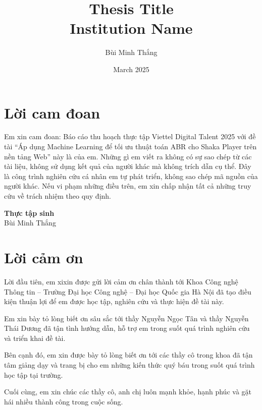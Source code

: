 \documentclass[12pt]{report}
\title{
    {Thesis Title}\\
    {\large Institution Name}\\
}
\author{Bùi Minh Thắng}
\date{March 2025}
\begin{document}




\chapter*{Lời cam đoan}
Em xin cam đoan: Báo cáo thu hoạch thực tập Viettel Digital Talent 2025 với đề tài “Áp dụng Machine Learning để tối ưu thuật toán ABR cho Shaka Player trên nền tảng Web” này là của em. Những gì em viết ra không có sự sao chép từ các tài liệu, không sử dụng kết quả của người khác mà không trích dẫn cụ thể. Đây là công trình nghiên cứu cá nhân em tự phát triển, không sao chép mã nguồn của người khác. Nếu vi phạm những điều trên, em xin chấp nhận tất cả những truy cứu về trách nhiệm theo quy định.

\vspace{2cm} %
\noindent
\hfill
\begin{minipage}{0.4\textwidth}
    \centering
    \textbf{Thực tập sinh}\\[1cm] %
    Bùi Minh Thắng
\end{minipage}

\chapter*{Lời cảm ơn}
Lời đầu tiên, em xixin được gửi lời cảm ơn chân thành tới Khoa Công nghệ Thông tin – Trường Đại học Công nghệ – Đại học Quốc gia Hà Nội đã tạo điều kiện thuận lợi để em được học tập, nghiên cứu và thực hiện đề tài này.

Em xin bày tỏ lòng biết ơn sâu sắc tới thầy Nguyễn Ngọc Tân và thầy Nguyễn Thái Dương đã tận tình hướng dẫn, hỗ trợ em trong suốt quá trình nghiên cứu và triển khai đề tài.

Bên cạnh đó, em xin được bày tỏ lòng biết ơn tới các thầy cô trong khoa đã tận tâm giảng dạy và trang bị cho em những kiến thức quý báu trong suốt quá trình học tập tại trường.

Cuối cùng, em xin chúc các thầy cô, anh chị luôn mạnh khỏe, hạnh phúc và gặt hái nhiều thành công trong cuộc sống.
\end{document}
